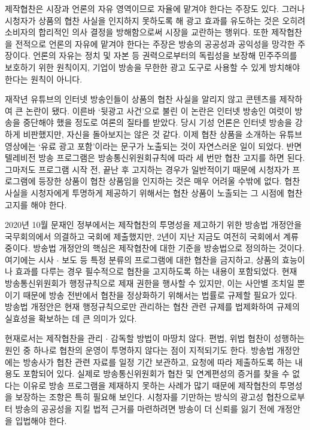 제작협찬은 시장과 언론의 자유 영역이므로 자율에 맡겨야 한다는 주장도 있다. 그러나 시청자가 상품의 협찬 사실을 인지하지 못하도록 해 광고 효과를 유도하는 것은 오히려 소비자의 합리적인 의사 결정을 방해함으로써 시장을 교란하는 행위다. 또한 제작협찬을 전적으로 언론의 자유에 맡겨야 한다는 주장은 방송의 공공성과 공익성을 망각한 주장이다. 언론의 자유는 정치 및 자본 등 권력으로부터의 독립성을 보장해 민주주의를 보호하기 위한 원칙이지, 기업이 방송을 무한한 광고 도구로 사용할 수 있게 방치해야 한다는 원칙이 아니다.

재작년 유튜브의 인터넷 방송인들이 상품의 협찬 사실을 알리지 않고 콘텐츠를 제작하여 큰 논란이 됐다. 이른바 `뒷광고 사건'으로 불린 이 논란은 인터넷 방송인 여럿이 방송을 중단해야 했을 정도로 여론의 질타를 받았다. 당시 기성 언론은 인터넷 방송을 강하게 비판했지만, 자신을 돌아보지는 않은 것 같다. 이제 협찬 상품을 소개하는 유튜브 영상에는 `유료 광고 포함'이라는 문구가 노출되는 것이 자연스러운 일이 되었다. 반면 텔레비전 방송 프로그램은 방송통신위원회규칙에 따라 세 번만 협찬 고지를 하면 된다. 그마저도 프로그램 시작 전, 끝난 후 고지하는 경우가 일반적이기 때문에 시청자가 프로그램에 등장한 상품이 협찬 상품임을 인지하는 것은 매우 어려울 수밖에 없다. 협찬 사실을 시청자에게 투명하게 제공하기 위해서는 협찬 상품이 노출되는 그 시점에 협찬고지를 해야 한다.

2020년 10월 문재인 정부에서는 제작협찬의 투명성을 제고하기 위한 방송법 개정안을 국무회의에서 의결하고 국회에 제출했지만, 2년이 지난 지금도 여전히 국회에서 계류 중이다. 방송법 개정안의 핵심은 제작협찬에 대한 기준을 방송법으로 정의하는 것이다. 여기에는 시사 $\cdot$ 보도 등 특정 분류의 프로그램에 대한 협찬을 금지하고, 상품의 효능이나 효과를 다루는 경우 필수적으로 협찬을 고지하도록 하는 내용이 포함되었다. 현재 방송통신위원회가 행정규칙으로 제재 권한을 행사할 수 있지만, 이는 사안별 조치일 뿐이기 때문에 방송 전반에서 협찬을 정상화하기 위해서는 법률로 규제할 필요가 있다\cite{ksj2020}. 방송법 개정안은 현재 행정규칙으로만 관리하는 협찬 관련 규제를 법제화하여 규제의 실효성을 확보하는 데 큰 의미가 있다.

현재로서는 제작협찬을 관리 $\cdot$ 감독할 방법이 마땅치 않다. 편법, 위법 협찬이 성행하는 원인 중 하나로 협찬의 운영이 투명하지 않다는 점이 지적되기도 한다\cite{jyw2016}. 방송법 개정안에는 방송사가 협찬 관련 자료를 일정 기간 보관하고, 요청에 따라 제출하도록 하는 내용도 포함되어 있다. 실제로 방송통신위원회가 협찬 및 연계편성의 증거를 찾을 수 없다는 이유로 방송 프로그램을 제재하지 못하는 사례가 많기 때문에 제작협찬의 투명성을 보장하는 조항은 특히 필요해 보인다. 시청자를 기만하는 방식의 광고성 협찬으로부터 방송의 공공성을 지킬 법적 근거를 마련하려면 방송이 더 신뢰를 잃기 전에 개정안을 입법해야 한다.

